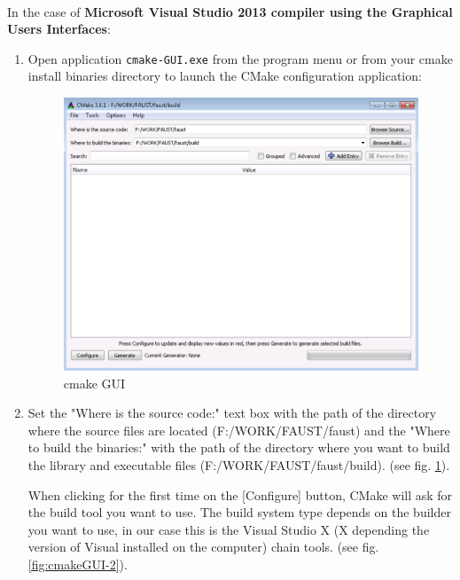 \paragraph{}In the case of \textbf{Microsoft Visual Studio 2013 compiler using the Graphical Users Interfaces}:
\begin{enumerate}
\item Open application \texttt{cmake-GUI.exe} from the program menu or from your cmake install binaries directory  to launch the CMake configuration application:

\begin{figure}[!h] %
\centering
\includegraphics[scale=0.5]{images/cmakeGUI-1-eps-converted-to.pdf}
\caption{cmake GUI}
\label{fig:cmakeGUI-1}
\end{figure}

\item Set the "Where is the source code:" text box with the path of the directory where the source files are located (F:/WORK/FAUST/faust) and the "Where to build the binaries:" with the path of the directory where you want to build the library and executable files (F:/WORK/FAUST/faust/build). (see fig.  \ref{fig:cmakeGUI-1}).

When clicking for the first time on the [Configure] button, CMake will ask for the build tool you want to use. The build system type depends on the builder you want to use, in our case this is the Visual Studio X (X depending the version of Visual installed on the computer) chain tools. (see fig. \ref{fig:cmakeGUI-2}).



\end{enumerate}
